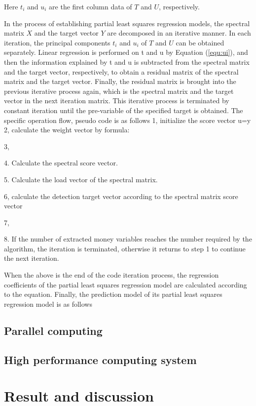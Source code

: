 \documentclass[a4paper,12pt,titlepage]{article} %
\numberwithin{equation}{section}  %
\begin{document}
	Here $t_i$ and $u_i$ are the first column data of $T$ and $U$, respectively.
	
	In the process of establishing partial least squares regression models, the spectral matrix $X$ and the target vector $Y$ are decomposed in an iterative manner. In each iteration, the principal components $t_i$ and $u_i$ of $T$ and $U$ can be obtained separately. Linear regression is performed on t and u by Equation (\ref{equ:ui}), and then the information explained by t and u is subtracted from the spectral matrix and the target vector, respectively, to obtain a residual matrix of the spectral matrix and the target vector. Finally, the residual matrix is brought into the previous iterative process again, which is the spectral matrix and the target vector in the next iteration matrix. This iterative process is terminated by constant iteration until the pre-variable of the specified target is obtained. The specific operation flow, pseudo code is as follows
	1, initialize the score vector u=y
	2, calculate the weight vector by formula:
	
	3,
	
	4. Calculate the spectral score vector.
	
	5. Calculate the load vector of the spectral matrix.
	
	6, calculate the detection target vector according to the spectral matrix score vector
	
	7,
	
	8. If the number of extracted money variables reaches the number required by the algorithm, the iteration is terminated, otherwise it returns to step 1 to continue the next iteration.
	
	When the above is the end of the code iteration process, the regression coefficients of the partial least squares regression model are calculated according to the equation.
	Finally, the prediction model of its partial least squares regression model is as follows
	
	\subsection{Parallel computing}
	\label{parallel}
	
	\subsection{High performance computing system}
	\label{myriad}
	
	
	\section{Result and discussion}
	\label{sec:result}
	
\end{document}
